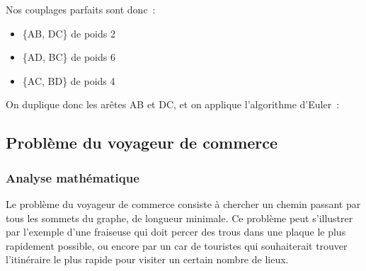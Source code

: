    Nos couplages parfaits sont donc~:

    \begin{itemize}
      \item \{AB, DC\} de poids 2
      \item \{AD, BC\} de poids 6
      \item \{AC, BD\} de poids 4
    \end{itemize}


    On duplique donc les arêtes AB et DC, et on applique l'algorithme d'Euler~:

    \begin{center}
    \end{center}

\subsection{Problème du voyageur de commerce}\label{sec:tsp}
  \subsubsection{Analyse mathématique}
    Le problème du voyageur de commerce consiste à chercher un chemin passant
    par tous les sommets du graphe, de longueur minimale.
    Ce problème peut s'illustrer par l'exemple d'une
    fraiseuse qui doit percer des trous dans une plaque le plus
    rapidement possible, ou encore par un car de touristes qui souhaiterait
    trouver l'itinéraire le plus rapide pour visiter un certain nombre de lieux.

